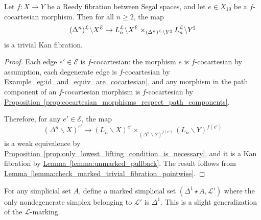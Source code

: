 \documentclass[main.tex]{subfiles}
\begin{document}
\begin{corollary}
  \label{cor:marked_left_spine_gives_triv_fib}
  Let $f\colon X \to Y$ be a Reedy fibration between Segal spaces, and let $e \in X_{10}$ be a $f$-cocartesian morphism. Then for all $n \geq 2$, the map
  \begin{equation*}
    (\Delta^{n})^{\mathcal{L}} \backslash X^{\mathcal{E}} \to L_{n}^{\mathcal{L}} \backslash X^{\mathcal{E}} \times_{(\Delta^{n})^{\mathcal{L}} \backslash Y^{\sharp}} L_{n}^{\mathcal{L}} \backslash Y^{\sharp}
  \end{equation*}
  is a trivial Kan fibration.
\end{corollary}
\begin{proof}
  Each edge $e' \in \mathcal{E}$ is $f$-cocartesian: the morphism $e$ is $f$-cocartesian by assumption, each degenerate edge is $f$-cocartesian by \hyperref[eg:id_and_equiv_are_cocartesian]{Example~\ref*{eg:id_and_equiv_are_cocartesian}}, and any morphism in the path component of an $f$-cocartesian morphism is $f$-cocartesian by \hyperref[prop:cocartesian_morphisms_respect_path_components]{Proposition~\ref*{prop:cocartesian_morphisms_respect_path_components}}.

  Therefore, for any $e' \in \mathcal{E}$, the map
  \begin{equation*}
    (\Delta^{n} \backslash X)^{e'} \to (L_{n} \backslash X)^{e'} \times_{(\Delta^{n} \backslash Y)^{f(e')}} (L_{n} \backslash Y)^{f(e')}
  \end{equation*}
  is a weak equivalence by \hyperref[prop:only_lowest_lifting_condition_is_necessary]{Proposition~\ref*{prop:only_lowest_lifting_condition_is_necessary}}, and it is a Kan fibration by \hyperref[lemma:unmarked_pullback]{Lemma~\ref*{lemma:unmarked_pullback}}. The result follows from \hyperref[lemma:check_marked_trivial_fibration_pointwise]{Lemma~\ref*{lemma:check_marked_trivial_fibration_pointwise}}.
\end{proof}

For any simplicial set $A$, define a marked simplicial set $(\Delta^{1} \star A, \mathcal{L'})$ where the only nondegenerate simplex belonging to $\mathcal{L}'$ is $\Delta^{1}$. This is a slight generalization of the $\mathcal{L}$-marking.
\end{document}
